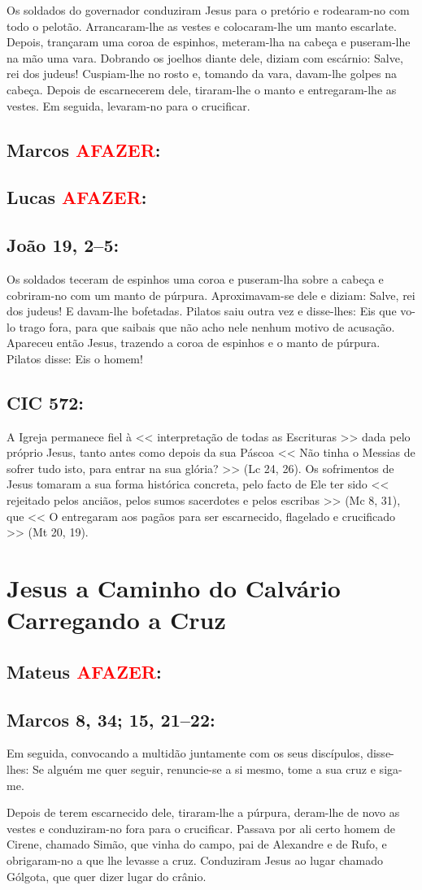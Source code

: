 \documentclass[10pt,a5paper]{book}
\newcommand{\from}[1]{\subsection*{#1}}
\newcommand{\TODO}{\textcolor{red}{\ttfamily AFAZER}}
\begin{document}
Os soldados do governador conduziram Jesus para o pretório e rodearam-no com todo o pelotão.
Arrancaram-lhe as vestes e colocaram-lhe um manto escarlate.
Depois, trançaram uma coroa de espinhos, meteram-lha na cabeça e puseram-lhe na mão uma vara. Dobrando os joelhos diante dele, diziam com escárnio: Salve, rei dos judeus!
Cuspiam-lhe no rosto e, tomando da vara, davam-lhe golpes na cabeça.
Depois de escarnecerem dele, tiraram-lhe o manto e entregaram-lhe as vestes. Em seguida, levaram-no para o crucificar.

\from{Marcos \TODO:}

\from{Lucas \TODO:}

\from{João 19, 2--5:}

Os soldados teceram de espinhos uma coroa e puseram-lha sobre a cabeça e cobriram-no com um manto de púrpura.
Aproximavam-se dele e diziam: Salve, rei dos judeus! E davam-lhe bofetadas.
Pilatos saiu outra vez e disse-lhes: Eis que vo-lo trago fora, para que saibais que não acho nele nenhum motivo de acusação.
Apareceu então Jesus, trazendo a coroa de espinhos e o manto de púrpura. Pilatos disse: Eis o homem!

\from{CIC 572:}

A Igreja permanece fiel à << interpretação de todas as Escrituras >> dada pelo próprio Jesus, tanto antes como depois da sua Páscoa << Não tinha o Messias de sofrer tudo isto, para entrar na sua glória? >> (Lc 24, 26).
Os sofrimentos de Jesus tomaram a sua forma histórica concreta, pelo facto de Ele ter sido << rejeitado pelos anciãos, pelos sumos sacerdotes e pelos escribas >> (Mc 8, 31), que << O entregaram aos pagãos para ser escarnecido, flagelado e crucificado >> (Mt 20, 19).


\section{Jesus a Caminho do Calvário Carregando a Cruz}

\from{Mateus \TODO:}

\from{Marcos 8, 34; 15, 21--22:}

Em seguida, convocando a multidão juntamente com os seus discípulos, disse-lhes: Se alguém me quer seguir, renuncie-se a si mesmo, tome a sua cruz e siga-me.

Depois de terem escarnecido dele, tiraram-lhe a púrpura, deram-lhe de novo as vestes e conduziram-no fora para o crucificar.
Passava por ali certo homem de Cirene, chamado Simão, que vinha do campo, pai de Alexandre e de Rufo, e obrigaram-no a que lhe levasse a cruz.
Conduziram Jesus ao lugar chamado Gólgota, que quer dizer lugar do crânio.
\end{document}

